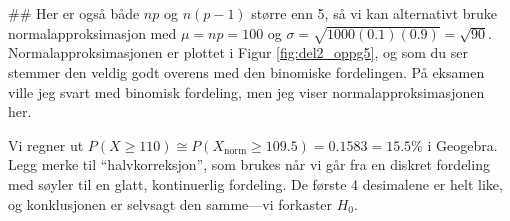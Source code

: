 \begin{easylist}[enumerate]
	## Her er også både $np$ og $n(p-1)$ større enn 5, så vi kan alternativt bruke
	normalapproksimasjon med $\mu =np=100 $ og $\sigma = \sqrt{1000 (0.1) (0.9)} = \sqrt{90}$. Normalapproksimasjonen er plottet i Figur \ref{fig:del2_oppg5}, og som du ser stemmer den veldig godt overens
	med den binomiske fordelingen.
	På eksamen ville jeg svart med binomisk fordeling, men jeg viser normalapproksimasjonen her.
	
	Vi regner ut $P(X \geq 110) \cong P(X_\text{norm} \geq 109.5) = 0.1583 = 15.5 \%$ i Geogebra. Legg merke til ``halvkorreksjon'', som brukes når vi går fra en diskret fordeling med søyler til en glatt, kontinuerlig fordeling. De første 4 desimalene er helt like, og konklusjonen er selvsagt den samme---vi forkaster $H_0$.
	
\end{easylist}

